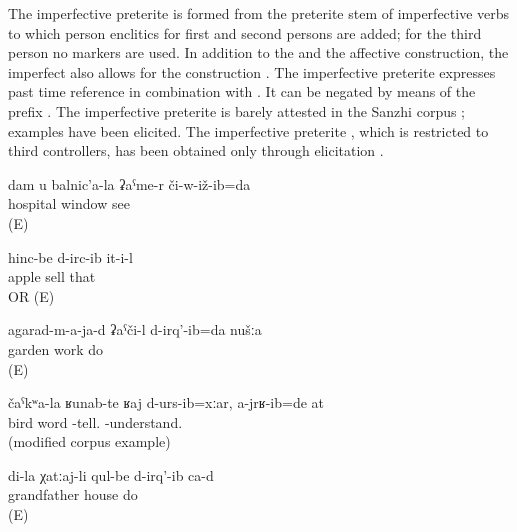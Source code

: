The imperfective preterite is formed from the preterite stem of imperfective verbs to which person enclitics for first and second persons are added; for the third person no markers are used. In addition to the  and the affective construction, the imperfect also allows for the  construction . The imperfective preterite expresses past time reference in combination with . It can be negated by means of the prefix . The imperfective preterite is barely attested in the Sanzhi corpus ; examples  have been elicited. The imperfective preterite , which is restricted to third  controllers, has been obtained only through elicitation .

\begin{exe}
	\ex	\label{ex:I saw you (repeatedly) from the window of the hospital}
	\gll	dam	u	balnic’a-la	ʡaˁme-r	či-w-iž-ib=da\\
				hospital	window	see\\
	\glt	{} (E)

	\ex	\label{ex:S/he sold apples analytic}
	\gll	hinc-be	d-irc-ib	it-i-l\\
		apple	sell	that\\
	\glt	{} OR  (E)

	\ex	\label{ex:We (repeatedly) worked in the garden}
	\gll	agarad-m-a-ja-d	ʡaˁči-l	d-irq'-ib=da	nušːa\\
		garden	work	do	\\
	\glt	{} (E)

	\ex	\label{ex:Although I said words like a bird, you did not understand them}
	\gll	čaˁkʷa-la	ʁunab-te	ʁaj	d-urs-ib=xːar,	a-jrʁ-ib=de	at\\
		bird	 	word	-tell.	-understand.	\\
	\glt	{} (modified corpus example)
	
	\ex	\label{ex:My grandfather (apparently) built houses analytic}
	\gll	di-la	χatːaj-li	qul-be	d-irq'-ib	ca-d\\
			grandfather	house	do	\\
	\glt	{} (E)

\end{exe}

